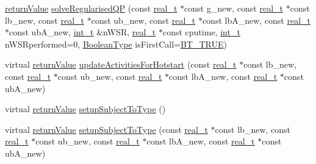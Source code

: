 \begin{DoxyCompactItemize}
\item 
\hyperlink{_message_handling_8hpp_a81d556f613bfbabd0b1f9488c0fa865e}{return\+Value} \hyperlink{class_q_problem_a57c95eb9cb1091f3c559502693c72660}{solve\+Regularised\+QP} (const \hyperlink{qp_o_a_s_e_s__wrapper_8h_a0d00e2b3dfadee81331bbb39068570c4}{real\+\_\+t} $\ast$const g\+\_\+new, const \hyperlink{qp_o_a_s_e_s__wrapper_8h_a0d00e2b3dfadee81331bbb39068570c4}{real\+\_\+t} $\ast$const lb\+\_\+new, const \hyperlink{qp_o_a_s_e_s__wrapper_8h_a0d00e2b3dfadee81331bbb39068570c4}{real\+\_\+t} $\ast$const ub\+\_\+new, const \hyperlink{qp_o_a_s_e_s__wrapper_8h_a0d00e2b3dfadee81331bbb39068570c4}{real\+\_\+t} $\ast$const lb\+A\+\_\+new, const \hyperlink{qp_o_a_s_e_s__wrapper_8h_a0d00e2b3dfadee81331bbb39068570c4}{real\+\_\+t} $\ast$const ub\+A\+\_\+new, \hyperlink{_types_8hpp_ab6fd6105e64ed14a0c9281326f05e623}{int\+\_\+t} \&n\+W\+SR, \hyperlink{qp_o_a_s_e_s__wrapper_8h_a0d00e2b3dfadee81331bbb39068570c4}{real\+\_\+t} $\ast$const cputime, \hyperlink{_types_8hpp_ab6fd6105e64ed14a0c9281326f05e623}{int\+\_\+t} n\+W\+S\+Rperformed=0, \hyperlink{_types_8hpp_a20f82124c82b6f5686a7fce454ef9089}{Boolean\+Type} is\+First\+Call=\hyperlink{_types_8hpp_a20f82124c82b6f5686a7fce454ef9089a34c57965bfb07125b09326a69019f9c6}{B\+T\+\_\+\+T\+R\+UE})
\item 
virtual \hyperlink{_message_handling_8hpp_a81d556f613bfbabd0b1f9488c0fa865e}{return\+Value} \hyperlink{class_q_problem_a5d08a37a3b34078ab704f0fe472f910a}{update\+Activities\+For\+Hotstart} (const \hyperlink{qp_o_a_s_e_s__wrapper_8h_a0d00e2b3dfadee81331bbb39068570c4}{real\+\_\+t} $\ast$const lb\+\_\+new, const \hyperlink{qp_o_a_s_e_s__wrapper_8h_a0d00e2b3dfadee81331bbb39068570c4}{real\+\_\+t} $\ast$const ub\+\_\+new, const \hyperlink{qp_o_a_s_e_s__wrapper_8h_a0d00e2b3dfadee81331bbb39068570c4}{real\+\_\+t} $\ast$const lb\+A\+\_\+new, const \hyperlink{qp_o_a_s_e_s__wrapper_8h_a0d00e2b3dfadee81331bbb39068570c4}{real\+\_\+t} $\ast$const ub\+A\+\_\+new)
\item 
virtual \hyperlink{_message_handling_8hpp_a81d556f613bfbabd0b1f9488c0fa865e}{return\+Value} \hyperlink{class_q_problem_af024ebec53f988671f24ee98e71394a1}{setup\+Subject\+To\+Type} ()
\item 
virtual \hyperlink{_message_handling_8hpp_a81d556f613bfbabd0b1f9488c0fa865e}{return\+Value} \hyperlink{class_q_problem_a2b526270858f09361f3a523124a0f0ba}{setup\+Subject\+To\+Type} (const \hyperlink{qp_o_a_s_e_s__wrapper_8h_a0d00e2b3dfadee81331bbb39068570c4}{real\+\_\+t} $\ast$const lb\+\_\+new, const \hyperlink{qp_o_a_s_e_s__wrapper_8h_a0d00e2b3dfadee81331bbb39068570c4}{real\+\_\+t} $\ast$const ub\+\_\+new, const \hyperlink{qp_o_a_s_e_s__wrapper_8h_a0d00e2b3dfadee81331bbb39068570c4}{real\+\_\+t} $\ast$const lb\+A\+\_\+new, const \hyperlink{qp_o_a_s_e_s__wrapper_8h_a0d00e2b3dfadee81331bbb39068570c4}{real\+\_\+t} $\ast$const ub\+A\+\_\+new)

\end{DoxyCompactItemize}
